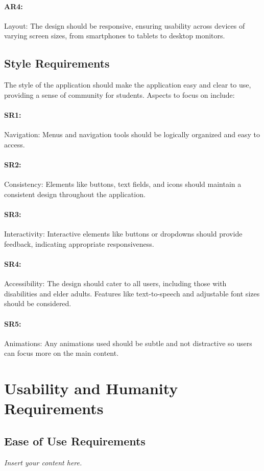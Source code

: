 \documentclass[12pt]{article}
\newcommand{\lips}{\textit{Insert your content here.}}
\begin{document}
\paragraph{AR4:}Layout: The design should be responsive, ensuring usability across devices of varying screen sizes, from smartphones to tablets to desktop monitors.

\subsection{Style Requirements}
The style of the application should make the application easy and clear to use, providing a sense of community for students. Aspects to focus on include:
\paragraph{SR1:}Navigation: Menus and navigation tools should be logically organized and easy to access. 
\paragraph{SR2:}Consistency: Elements like buttons, text fields, and icons should maintain a consistent design throughout the application.
\paragraph{SR3:}Interactivity: Interactive elements like buttons or dropdowns should provide feedback, indicating appropriate responsiveness.
\paragraph{SR4:}Accessibility: The design should cater to all users, including those with disabilities and elder adults. Features like text-to-speech and adjustable font sizes should be considered.
\paragraph{SR5:}Animations: Any animations used should be subtle and not distractive so users can focus more on the main content. 



\section{Usability and Humanity Requirements}
\subsection{Ease of Use Requirements}
\lips
\end{document}
